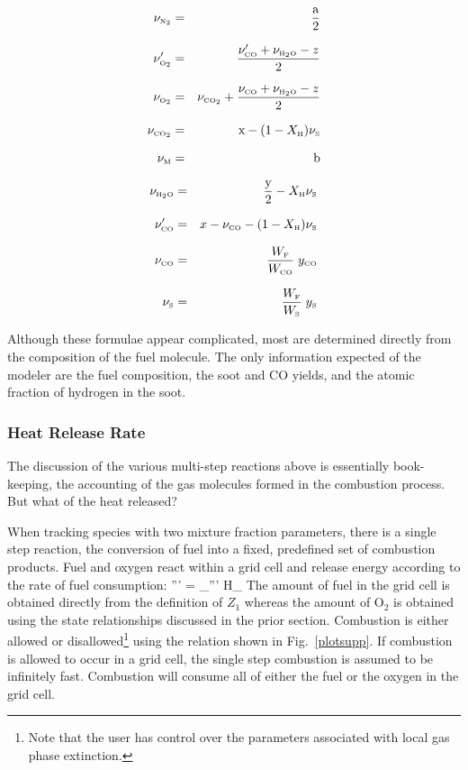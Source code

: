 \documentclass[11pt]{book}
\begin{document}
\parbox{2.5in}{
\begin{eqnarray*} \nu_{\tiny \hbox{N}_2}  &=& \frac{\hbox{a}}{2}\\*[.1in]
                  \nu_{\tiny \hbox{O}_2}' &=& \frac{\nu_{\tiny \hbox{CO}}'+\nu_{\tiny \hbox{H}_2\hbox{O}}-z}{2}\\*[.1in]
                  \nu_{\tiny \hbox{O}_2}  &=& \nu_{\tiny \hbox{CO}_2} + \frac{\nu_{\tiny \hbox{CO}}+\nu_{\tiny \hbox{H}_2\hbox{O}}-z}{2}\\*[.1in]
                  \nu_{\tiny \hbox{CO}_2} &=& \hbox{x} - (1-X_{\tiny \hbox{H}}) \nu_{\tiny \hbox{S}} \\*[.1in]
                  \nu_{\tiny \hbox{M}}     &=& \hbox{b} \end{eqnarray*} }
\hfill \parbox{3.5in}{\begin{eqnarray}
                  \nu_{\tiny \hbox{H}_2\hbox{O}} &=& \frac{\hbox{y}}{2}- X_{\tiny \hbox{H}} \nu_{\tiny \hbox{S}}\\*[.1in]
                  \nu_{\tiny \hbox{CO}}'   &=& x - \nu_{\tiny \hbox{CO}} - (1-X_{\tiny \hbox{H}}) \nu_{\tiny \hbox{S}} \\*[.1in]
                  \nu_{\tiny \hbox{CO}}    &=& \frac{W_{\tiny \hbox{F}}}{W_{\tiny \hbox{CO}}} \; y_{\tiny \hbox{CO}} \\*[.1in]
                  \nu_{\tiny \hbox{S}}    &=& \frac{W_{\tiny \hbox{F}}}{W_{\tiny \hbox{S}}} \; y_{\tiny \hbox{S}}
\end{eqnarray} }
Although these formulae appear complicated, most are determined directly from the composition of the fuel molecule. The only information
expected of the modeler are the fuel composition, the soot and CO yields, and the atomic fraction of hydrogen in the soot.


\subsubsection{Heat Release Rate}

The discussion of the various multi-step reactions above is essentially book-keeping, the accounting of the gas
molecules formed in the combustion process. But what of the heat released?

When tracking species with two mixture fraction parameters, there is a single step reaction, the conversion of fuel into a
fixed, predefined set of combustion products.  Fuel and oxygen react within a grid cell and release energy according to
the rate of fuel consumption:
\be \dq''' = \dm_\F''' \Delta H_{\F} \ee
The amount of fuel in the grid cell is obtained directly from the definition of $Z_1$ whereas the amount of O$_2$ is
obtained using the state relationships discussed in the prior section.  Combustion is either allowed or
disallowed\footnote{Note that the user has control over the parameters associated with local gas phase extinction.}
using the relation shown in Fig.~\ref{plotsupp}.
If combustion is allowed to occur in a grid
cell, the single step combustion is assumed to be
infinitely fast.  Combustion will consume all of either the fuel or the oxygen in the grid cell.
\end{document}
